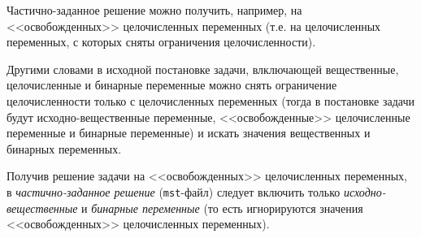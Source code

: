 \documentclass[%
	11pt,
	a4paper,
	utf8,
		]{article}
\begin{document}

Частично-заданное решение можно получить, например, на <<освобожденных>> целочисленных переменных (т.е. на целочисленных переменных, с которых сняты ограничения целочисленности).

Другими словами в исходной постановке задачи, влключающей вещественные, целочисленные и бинарные переменные можно снять ограничение целочисленности только с целочисленных переменных (тогда в постановке задачи будут исходно-вещественные переменные, <<освобожденные>> целочисленные переменные и бинарные переменные) и искать значения вещественных и бинарных переменных.

Получив решение задачи на <<освобожденных>> целочисленных переменных, в \emph{частично-заданное решение} (\verb|mst|-файл) следует включить только \emph{исходно-вещественные} и \emph{бинарные переменные} (то есть игнорируются значения <<освобожденных>> целочисленных переменных).
\end{document}
